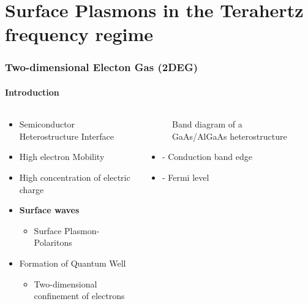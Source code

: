 \documentclass[mathserif,18pt,xcolor=table]{beamer}
\begin{document}
\section{Surface Plasmons in the Terahertz frequency regime}
\begin{frame}
  \frametitle{Two-dimensional Electon Gas (2DEG)}
  \framesubtitle{Introduction}
  \begin{columns} %
    \begin{column}{.5\textwidth}
      \begin{minipage}[T][.1\textheight][c]{\linewidth}
        \begin{itemize}
          \item Semiconductor Heterostructure Interface
          \item High electron Mobility
          \item High concentration of electric charge
          \item \textbf{Surface waves}
          \begin{itemize}
            \item[]{Surface Plasmon-Polaritons}
          \end{itemize}
          \item Formation of Quantum Well
          \begin{itemize}
            \item[]{Two-dimensional confinement of electrons}
          \end{itemize}
        \end{itemize}
      \end{minipage}
    \end{column}
    \begin{column}{.5\textwidth}
      \begin{figure}
        \vspace*{-1cm}
        \def\svgwidth{\linewidth}
        
        \caption{Band diagram of a GaAs/AlGaAs heterostructure}
      \end{figure}
      \begin{itemize}
        \item[]{ - Conduction band edge}
        \item[]{ - Fermi level}
      \end{itemize}
      \end{column}%
    \end{columns}
  \end{frame}
\end{document}
